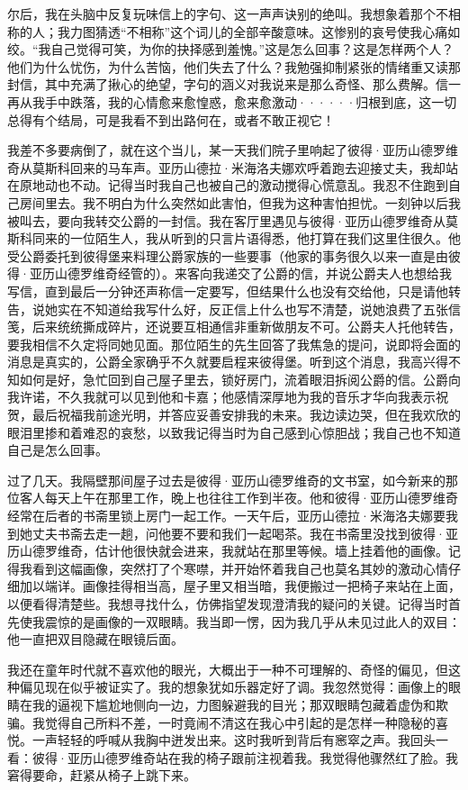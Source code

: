 \documentclass[12pt, UTF8]{ctexbook}
\begin{document}
\par 尔后，我在头脑中反复玩味信上的字句、这一声声诀别的绝叫。我想象着那个不相称的人；我力图猜透“不相称”这个词儿的全部辛酸意味。这惨别的哀号使我心痛如绞。“我自己觉得可笑，为你的抉择感到羞愧。”这是怎么回事？这是怎样两个人？他们为什么忧伤，为什么苦恼，他们失去了什么？我勉强抑制紧张的情绪重又读那封信，其中充满了揪心的绝望，字句的涵义对我说来是那么奇怪、那么费解。信一再从我手中跌落，我的心情愈来愈惶惑，愈来愈激动······归根到底，这一切总得有个结局，可是我看不到出路何在，或者不敢正视它！
\par 我差不多要病倒了，就在这个当儿，某一天我们院子里响起了彼得·亚历山德罗维奇从莫斯科回来的马车声。亚历山德拉·米海洛夫娜欢呼着跑去迎接丈夫，我却站在原地动也不动。记得当时我自己也被自己的激动搅得心慌意乱。我忍不住跑到自己房间里去。我不明白为什么突然如此害怕，但我为这种害怕担忧。一刻钟以后我被叫去，要向我转交公爵的一封信。我在客厅里遇见与彼得·亚历山德罗维奇从莫斯科同来的一位陌生人，我从听到的只言片语得悉，他打算在我们这里住很久。他受公爵委托到彼得堡来料理公爵家族的一些要事（他家的事务很久以来一直是由彼得·亚历山德罗维奇经管的）。来客向我递交了公爵的信，并说公爵夫人也想给我写信，直到最后一分钟还声称信一定要写，但结果什么也没有交给他，只是请他转告，说她实在不知道给我写什么好，反正信上什么也写不清楚，说她浪费了五张信笺，后来统统撕成碎片，还说要互相通信非重新做朋友不可。公爵夫人托他转告，要我相信不久定将同她见面。那位陌生的先生回答了我焦急的提问，说即将会面的消息是真实的，公爵全家确乎不久就要启程来彼得堡。听到这个消息，我高兴得不知如何是好，急忙回到自己屋子里去，锁好房门，流着眼泪拆阅公爵的信。公爵向我许诺，不久我就可以见到他和卡嘉；他感情深厚地为我的音乐才华向我表示祝贺，最后祝福我前途光明，并答应妥善安排我的未来。我边读边哭，但在我欢欣的眼泪里掺和着难忍的哀愁，以致我记得当时为自己感到心惊胆战；我自己也不知道自己是怎么回事。
\par 过了几天。我隔壁那间屋子过去是彼得·亚历山德罗维奇的文书室，如今新来的那位客人每天上午在那里工作，晚上也往往工作到半夜。他和彼得·亚历山德罗维奇经常在后者的书斋里锁上房门一起工作。一天午后，亚历山德拉·米海洛夫娜要我到她丈夫书斋去走一趟，问他要不要和我们一起喝茶。我在书斋里没找到彼得·亚历山德罗维奇，估计他很快就会进来，我就站在那里等候。墙上挂着他的画像。记得我看到这幅画像，突然打了个寒噤，并开始怀着我自己也莫名其妙的激动心情仔细加以端详。画像挂得相当高，屋子里又相当暗，我便搬过一把椅子来站在上面，以便看得清楚些。我想寻找什么，仿佛指望发现澄清我的疑问的关键。记得当时首先使我震惊的是画像的一双眼睛。我当即一愣，因为我几乎从未见过此人的双目：他一直把双目隐藏在眼镜后面。
\par 我还在童年时代就不喜欢他的眼光，大概出于一种不可理解的、奇怪的偏见，但这种偏见现在似乎被证实了。我的想象犹如乐器定好了调。我忽然觉得：画像上的眼睛在我的逼视下尴尬地侧向一边，力图躲避我的目光；那双眼睛包藏着虚伪和欺骗。我觉得自己所料不差，一时竟闹不清这在我心中引起的是怎样一种隐秘的喜悦。一声轻轻的呼喊从我胸中迸发出来。这时我听到背后有窸窣之声。我回头一看：彼得·亚历山德罗维奇站在我的椅子跟前注视着我。我觉得他骤然红了脸。我窘得要命，赶紧从椅子上跳下来。
\end{document}
